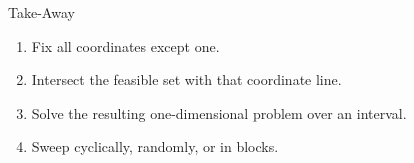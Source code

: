 \documentclass[11pt,compress,t,notes=noshow, xcolor=table]{beamer}
\begin{document}
\begin{framev}{Take-Away}
\begin{enumerate}
\item Fix all coordinates except one.
\item Intersect the feasible set with that coordinate line.
\item Solve the resulting one-dimensional problem over an interval.
\item Sweep cyclically, randomly, or in blocks.
\end{enumerate}
\end{framev}

\endlecture
\end{document}

